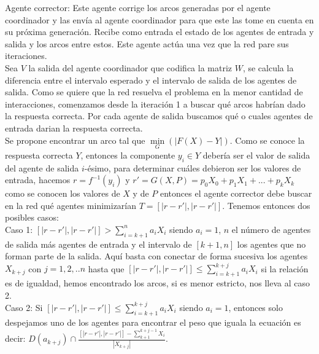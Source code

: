 \documentclass{article}
\begin{document}
        Agente corrector: Este agente corrige los arcos generadas por el agente coordinador y las envía al agente coordinador para que este las tome en cuenta en su próxima generación. Recibe como entrada el estado de los agentes de entrada y salida y los arcos entre estos. Este agente actúa una vez que la red pare sus iteraciones. \\

        Sea $V$ la salida del agente coordinador que codifica la matriz $W$, se calcula la diferencia entre el intervalo esperado y el intervalo de salida de los agentes de salida.
        Como se quiere que la red resuelva el problema en la menor cantidad de interacciones, comenzamos desde la iteración 1 a buscar qué arcos habrían dado la
        respuesta correcta. Por cada agente de salida buscamos qué o cuales agentes de entrada darian la respuesta correcta.  \\

        Se propone encontrar un arco tal que $\underset{G}{\min}(|F(X)-Y|)$. Como se conoce la respuesta correcta $Y$, entonces la componente $y_i \in Y$ debería ser el valor de salida del agente de salida $i$-ésimo, para determinar cuáles debieron ser los valores de entrada, hacemos $r=f^{-1}(y_i)$ y $r'=G(X,P)=p_0X_0 + p_1X_1 +...+p_kX_k$ como se conocen los valores de $X$ y de $P$
        entonces el agente corrector debe buscar en la red qué agentes minimizarían $T=[|r-r'|,|r-r'|]$. Tenemos entonces dos posibles casos: \\

        Caso 1: $[|r-r'|,|r-r'|] > \sum_{i=k+1}^{n} a_iX_i$ siendo $a_i=1$, $n$ el número de agentes de salida más agentes de entrada y el intervalo de $[k+1,n]$ los agentes
        que no forman parte de la salida. Aquí basta con conectar de forma sucesiva los agentes $X_{k+j}$ con $j=1,2,..n$ hasta que $[|r-r'|,|r-r'|] \leqslant \sum_{i=k+1}^{k+j} a_iX_i$ si la relación es de igualdad, hemos encontrado los arcos,
         si es menor estricto, nos lleva al caso 2.\\

        Caso 2: Si $[|r-r'|,|r-r'|] \leqslant \sum_{i=k+1}^{k+j} a_iX_i$ siendo $a_i=1$, entonces solo despejamos uno de los agentes para encontrar el peso que iguala la ecuación
        es decir: $D(a_{k+j}) \cap \frac{[|r-r'|,|r-r'|] - \sum_{k+1}^{k+j-1} X_i}{|X_{k+j}|}$.\\
\end{document}
